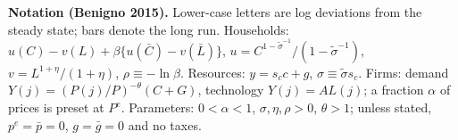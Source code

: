 \documentclass[11pt,a4paper]{article}
\begin{document}
\cabecalho

{\footnotesize\noindent\textbf{Notation (Benigno 2015).} Lower-case letters are log deviations from the
steady state; bars denote the long run. Households: $u(C)-v(L)+\beta\{u(\bar C)-v(\bar L)\}$,
$u=C^{1-\tilde\sigma^{-1}}/(1-\tilde\sigma^{-1})$, $v=L^{1+\eta}/(1+\eta)$, $\rho\equiv-\ln\beta$. Resources: $y=s_cc+g$,
$\sigma\equiv\tilde\sigma s_c$. Firms: demand $Y(j)=(P(j)/P)^{-\theta}(C+G)$, technology $Y(j)=AL(j)$; a fraction $\alpha$ of
prices is preset at $P^e$. Parameters: $0<\alpha<1$, $\sigma,\eta,\rho>0$, $\theta>1$;
unless stated, $p^e=\bar p=0$, $g=\bar g=0$ and no taxes.\par}





\end{document}
